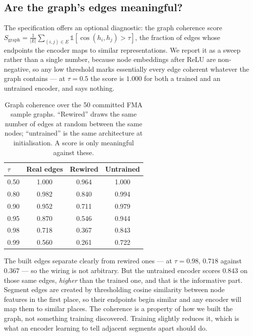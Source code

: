 \documentclass[conference]{IEEEtran}
\begin{document}
\subsection{Are the graph's edges meaningful?}

The specification offers an optional diagnostic: the graph coherence score
$S_{\mathrm{graph}} = \frac{1}{|E|}\sum_{(i,j)\in E}\mathbb{1}[\cos(h_i,h_j) >
\tau]$, the fraction of edges whose endpoints the encoder maps to similar
representations. We report it as a sweep rather than a single number, because
node embeddings after ReLU are non-negative, so any low threshold marks
essentially every edge coherent whatever the graph contains --- at $\tau=0.5$
the score is $1.000$ for both a trained and an untrained encoder, and says
nothing.

\begin{table}[H]
\centering\small
\caption{Graph coherence over the 50 committed FMA sample graphs. ``Rewired''
draws the same number of edges at random between the same nodes; ``untrained''
is the same architecture at initialisation. A score is only meaningful against
these.}
\label{tab:coherence}
\begin{tabular}{lccc}
\toprule
$\tau$ & Real edges & Rewired & Untrained \\
\midrule
0.50 & 1.000 & 0.964 & 1.000 \\
0.80 & 0.982 & 0.840 & 0.994 \\
0.90 & 0.952 & 0.711 & 0.979 \\
0.95 & 0.870 & 0.546 & 0.944 \\
0.98 & 0.718 & 0.367 & 0.843 \\
0.99 & 0.560 & 0.261 & 0.722 \\
\bottomrule
\end{tabular}
\end{table}

\noindent The built edges separate clearly from rewired ones --- at $\tau=0.98$,
$0.718$ against $0.367$ --- so the wiring is not arbitrary. But the untrained
encoder scores $0.843$ on those same edges, \emph{higher} than the trained one,
and that is the informative part. Segment edges are created by thresholding
cosine similarity between node features in the first place, so their endpoints
begin similar and any encoder will map them to similar places. The coherence is
a property of how we built the graph, not something training discovered.
Training slightly reduces it, which is what an encoder learning to tell
adjacent segments apart should do.
\end{document}
